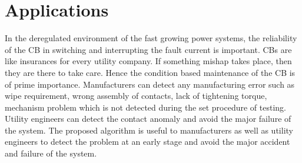 \section{Applications}
In the deregulated environment of the fast growing power systems, the reliability of the CB in switching and interrupting the fault current is important. CBs are like insurances for every utility company. If something mishap takes place, then they are there to take care. Hence the condition based maintenance of the CB is of prime importance. Manufacturers can detect any manufacturing error such as wipe requirement, wrong assembly of contacts, lack of tightening torque, mechanism problem which is not detected during the set procedure of testing. Utility engineers can detect the contact anomaly and avoid the major failure of the system. The proposed algorithm is useful to manufacturers as well as utility engineers to detect the problem at an early stage and avoid the major accident and failure of the system.
\clearpage

